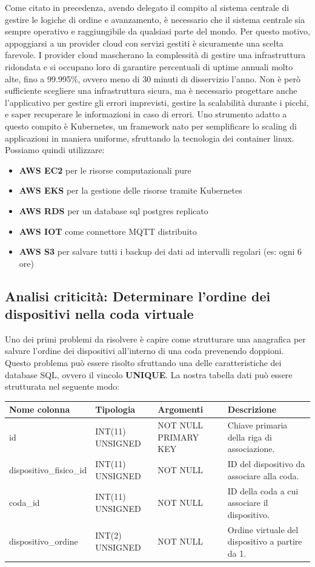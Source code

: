 \documentclass[a4paper, titlepage, 12pt, openright, twoside]{book}
\begin{document}
Come citato in precedenza, avendo delegato il compito al sistema centrale di gestire le logiche di ordine e avanzamento, è necessario che il sistema centrale sia sempre operativo
e raggiungibile da qualsiasi parte del mondo. Per questo motivo, appoggiarsi a un provider cloud con servizi gestiti è sicuramente una scelta farevole. I provider cloud mascherano
la complessità di gestire una infrastruttura ridondata e si occupano loro di garantire percentuali di uptime annuali molto alte, fino a 99.995\%, ovvero meno di 30 minuti di disservizio l'anno. Non è però sufficiente scegliere una infrastruttura sicura, ma è necessario progettare anche l'applicativo per gestire gli errori imprevisti, gestire la scalabilità durante i picchi, e saper recuperare le informazioni in caso di errori. Uno strumento adatto a questo compito è Kubernetes, un framework nato per semplificare lo scaling di applicazioni in maniera uniforme, sfruttando la tecnologia dei container linux. Possiamo quindi utilizzare:
\begin{itemize}
	\item \textbf{AWS EC2} per le risorse computazionali pure
	\item \textbf{AWS EKS} per la gestione delle risorse tramite Kubernetes
	\item \textbf{AWS RDS} per un database sql postgres replicato
	\item \textbf{AWS IOT} come connettore MQTT distribuito
	\item \textbf{AWS S3} per salvare tutti i backup dei dati ad intervalli regolari (es: ogni 6 ore)
\end{itemize}

\subsection{Analisi criticità: Determinare l'ordine dei dispositivi nella coda virtuale}

Uno dei primi problemi da risolvere è capire come strutturare una anagrafica per salvare l'ordine dei dispositivi all'interno di una coda prevenendo doppioni.
Questo problema può essere risolto sfruttando una delle caratteristiche dei database SQL, ovvero il vincolo \textbf{UNIQUE}.
La nostra tabella dati può essere strutturata nel seguente modo:

\begin{center}
    \begin{tabular}{ | l | l | p{3cm} | p{3cm} |}
    \hline
    Nome colonna & Tipologia & Argomenti & Descrizione \\ \hline
    id & INT(11) UNSIGNED & NOT NULL PRIMARY KEY & Chiave primaria della riga di associazione. \\ \hline
    dispositivo\_fisico\_id & INT(11) UNSIGNED & NOT NULL & ID del dispositivo da associare alla coda. \\ \hline
    coda\_id & INT(11) UNSIGNED & NOT NULL & ID della coda a cui associare il dispositivo. \\ \hline
    dispositivo\_ordine & INT(2) UNSIGNED & NOT NULL & Ordine virtuale del dispositivo a partire da 1. \\ \hline
    \end{tabular}
\end{center}
\end{document}
